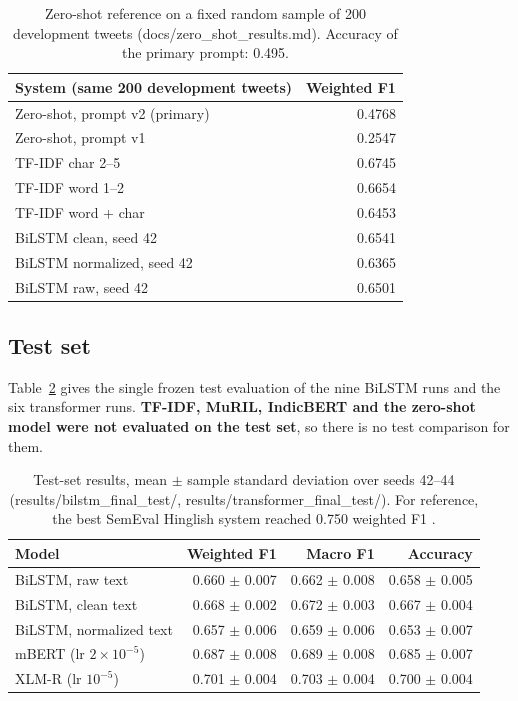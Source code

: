 \documentclass{nle}
\begin{document}
\begin{table}
\centering
\caption{Zero-shot reference on a fixed random sample of 200 development tweets (docs/zero\_shot\_results.md). Accuracy of the
primary prompt: 0.495.}
\label{tab:zs}
\begin{tabular}{lr}
\hline\hline
System (same 200 development tweets) & Weighted F1 \\
\hline
Zero-shot, prompt v2 (primary) & 0.4768 \\
Zero-shot, prompt v1 & 0.2547 \\
TF-IDF char 2--5 & 0.6745 \\
TF-IDF word 1--2 & 0.6654 \\
TF-IDF word + char & 0.6453 \\
BiLSTM clean, seed 42 & 0.6541 \\
BiLSTM normalized, seed 42 & 0.6365 \\
BiLSTM raw, seed 42 & 0.6501 \\
\hline\hline
\end{tabular}
\end{table}

\subsection{Test set}
Table~\ref{tab:test} gives the single frozen test evaluation of the nine BiLSTM runs and the six transformer runs. \textbf{TF-IDF, MuRIL, IndicBERT and the zero-shot model were not evaluated on the test set}, so there is no test comparison for them.

\begin{table}
\centering
\caption{Test-set results, mean $\pm$ sample standard deviation over seeds 42--44 (results/bilstm\_final\_test/, results/transformer\_final\_test/). For reference,
the best SemEval Hinglish system reached 0.750 weighted F1 \protect\cite{patwa2020}.}
\label{tab:test}
\begin{tabular}{lrrr}
\hline\hline
Model & Weighted F1 & Macro F1 & Accuracy \\
\hline
BiLSTM, raw text & 0.660 $\pm$ 0.007 & 0.662 $\pm$ 0.008 & 0.658 $\pm$ 0.005 \\
BiLSTM, clean text & 0.668 $\pm$ 0.002 & 0.672 $\pm$ 0.003 & 0.667 $\pm$ 0.004 \\
BiLSTM, normalized text & 0.657 $\pm$ 0.006 & 0.659 $\pm$ 0.006 & 0.653 $\pm$ 0.007 \\
mBERT (lr $2\times10^{-5}$) & 0.687 $\pm$ 0.008 & 0.689 $\pm$ 0.008 & 0.685 $\pm$ 0.007 \\
XLM-R (lr $10^{-5}$) & 0.701 $\pm$ 0.004 & 0.703 $\pm$ 0.004 & 0.700 $\pm$ 0.004 \\
\hline\hline
\end{tabular}
\end{table}
\end{document}

